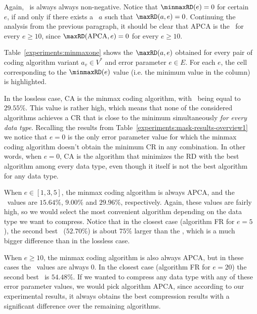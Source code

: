 \vspace{-3pt}
Again, \minmaxRD\ is always always non-negative. Notice that $\text{\minmaxRD}(e)=0$ for certain $e$, if and only if there exists a \minmaxca\ $a$ such that $\text{\maxRD}(a, e)=0$. Continuing the analysis from the previous paragraph, it should be clear that APCA is the \minmaxca\ for every $e \geq 10$, since $\text{\maxRD}(\text{APCA}, e)=0$ for every $e \geq 10$.


Table~\ref{experiments:minmaxone} shows the $\text{\maxRD}(a, e)$ obtained for every pair of coding algorithm variant $a_v \in V^*$ and error parameter $e \in E$. For each $e$, the cell corresponding to the $\text{\minmaxRD}(e)$ value (i.e. the minimum value in the column) is highlighted.
\vspace{+3pt}





In the lossless case, CA is the minmax coding algorithm, with \minmaxRD \ being equal to $29.55\%$. This value is rather high, which means that none of the considered algorithms achieves a CR that is close to the minimum simultaneously \textit{for every data type}. 
Recalling the results from Table~\ref{experiments:mask-results-overview1} we notice that $e=0$ is the only error parameter value for which the minmax coding algorithm doesn't obtain the minimum CR in any combination. In other words, when $e=0$, CA is the algorithm that minimizes the RD with the best algorithm among every data type, even though it itself is not the best algorithm for any data type.


When $e \in [1, 3, 5]$, the minmax coding algorithm is always APCA, and the \minmaxRD \ values are $15.64\%$, $9.00\%$ and $29.96\%$, respectively. Again, these values are fairly high, so we would select the most convenient algorithm depending on the data type we want to compress. 
Notice that in the closest case (algorithm FR for $e=5$), the second best \maxRD\ ($52.70\%$) is about $75\%$ larger than the \minmaxRD, which is a much bigger difference than in the lossless case.


When $e \geq 10$, the minmax coding algorithm is also always APCA, but in these cases the \minmaxRD \ values are always 0. In the closest case (algorithm FR for $e=20$) the second best \maxRD\ is $54.48\%$. If we wanted to compress any data type with any of these error parameter values, we would pick algorithm APCA, since according to our experimental results, it always obtains the best compression results with a significant difference over the remaining algorithms.

